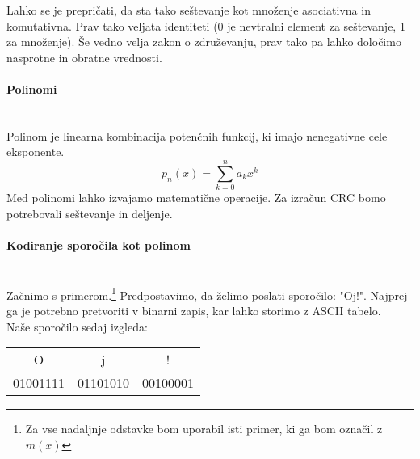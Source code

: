 \documentclass[12pt]{article}
\begin{document}
                Lahko se je prepričati, da sta tako seštevanje kot množenje
                asociativna in komutativna. Prav tako veljata identiteti (0 je 
                nevtralni element za seštevanje, 1 za množenje). Še vedno velja 
                zakon o združevanju, prav tako pa lahko določimo nasprotne in 
                obratne vrednosti. 
            
            \paragraph{Polinomi} \mbox{}\\
                Polinom je linearna kombinacija potenčnih funkcij, ki imajo 
                nenegativne cele eksponente.
                \begin{equation}
                    p_n (x) = \sum_{k=0}^n a_kx^k
                \end{equation}
                Med polinomi lahko izvajamo matematične operacije. Za izračun
                CRC bomo potrebovali seštevanje in deljenje. 
            
            \paragraph{Kodiranje sporočila kot polinom} \mbox{}\\
                Začnimo s primerom.\footnote{Za vse nadaljnje odstavke bom 
                uporabil isti primer, ki ga bom označil z $m(x)$} 
                Predpostavimo, da želimo poslati sporočilo: "Oj!". Najprej ga je
                potrebno pretvoriti v binarni zapis, kar lahko storimo z ASCII
                tabelo.\\
                Naše sporočilo sedaj izgleda:

                \begin{table}[h!]
                    \centering
                    \begin{tabular}{ccc}
                    O        & j        & !        \\
                    01001111 & 01101010 & 00100001
                    \end{tabular}
                \end{table}
\end{document}
